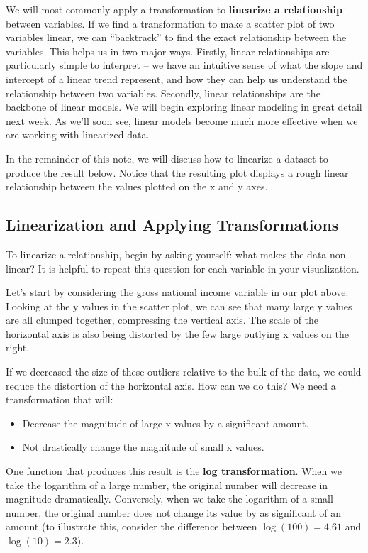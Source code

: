 \documentclass[
  letterpaper,
  DIV=11,
  numbers=noendperiod]{scrreprt}
\providecommand{\tightlist}{%
  \setlength{\itemsep}{0pt}\setlength{\parskip}{0pt}}\usepackage{longtable,booktabs,array}
\begin{document}
We will most commonly apply a transformation to \textbf{linearize a
relationship} between variables. If we find a transformation to make a
scatter plot of two variables linear, we can ``backtrack'' to find the
exact relationship between the variables. This helps us in two major
ways. Firstly, linear relationships are particularly simple to interpret
-- we have an intuitive sense of what the slope and intercept of a
linear trend represent, and how they can help us understand the
relationship between two variables. Secondly, linear relationships are
the backbone of linear models. We will begin exploring linear modeling
in great detail next week. As we'll soon see, linear models become much
more effective when we are working with linearized data.

In the remainder of this note, we will discuss how to linearize a
dataset to produce the result below. Notice that the resulting plot
displays a rough linear relationship between the values plotted on the x
and y axes.

\subsection{Linearization and Applying
Transformations}\label{linearization-and-applying-transformations}

To linearize a relationship, begin by asking yourself: what makes the
data non-linear? It is helpful to repeat this question for each variable
in your visualization.

Let's start by considering the gross national income variable in our
plot above. Looking at the y values in the scatter plot, we can see that
many large y values are all clumped together, compressing the vertical
axis. The scale of the horizontal axis is also being distorted by the
few large outlying x values on the right.

If we decreased the size of these outliers relative to the bulk of the
data, we could reduce the distortion of the horizontal axis. How can we
do this? We need a transformation that will:

\begin{itemize}
\tightlist
\item
  Decrease the magnitude of large x values by a significant amount.
\item
  Not drastically change the magnitude of small x values.
\end{itemize}

One function that produces this result is the \textbf{log
transformation}. When we take the logarithm of a large number, the
original number will decrease in magnitude dramatically. Conversely,
when we take the logarithm of a small number, the original number does
not change its value by as significant of an amount (to illustrate this,
consider the difference between \(\log{(100)} = 4.61\) and
\(\log{(10)} = 2.3\)).
\end{document}
